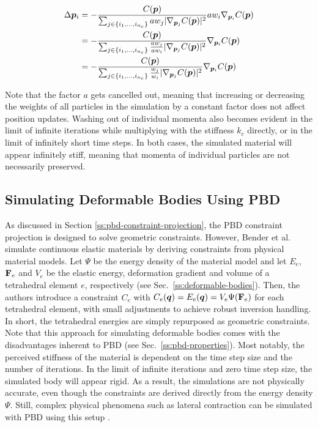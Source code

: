\begin{equation}\label{eq:pbd-masses}
    \begin{split}
        \Delta \bm{p}_i 
        &= -\frac{C(\bm{p})}{\sum_{j \in \{ i_1, \ldots, i_{n_c} \}} aw_j \vert \nabla_{\bm{p}_j}C(\bm{p}) \vert^2 } aw_i \nabla_{\bm{p}_i} C(\bm{p}) \\
        &= -\frac{C(\bm{p})}{\sum_{j \in \{ i_1, \ldots, i_{n_c} \}} \frac{aw_j}{aw_i} \vert \nabla_{\bm{p}_j}C(\bm{p}) \vert^2 } \nabla_{\bm{p}_i} C(\bm{p}) \\
        &= -\frac{C(\bm{p})}{\sum_{j \in \{ i_1, \ldots, i_{n_c} \}} \frac{w_j}{w_i} \vert \nabla_{\bm{p}_j}C(\bm{p}) \vert^2 } \nabla_{\bm{p}_i} C(\bm{p})
    \end{split}
\end{equation}

\noindent Note that the factor $a$ gets cancelled out, meaning that increasing or decreasing the weights of all particles in the simulation by a constant
factor does not affect position updates. Washing out of individual momenta also becomes evident in the limit of infinite iterations while multiplying 
with the stiffness $k_c$ directly, or in the limit of infinitely short time steps. In both cases, the simulated material will appear infinitely stiff, 
meaning that momenta of individual particles are not necessarily preserved.

\subsection{Simulating Deformable Bodies Using PBD}\label{ss:pbd-deformable-bodies}
As discussed in Section \ref{ss:pbd-constraint-projection}, the PBD constraint projection is designed to solve geometric constraints. However, Bender et al.\ 
\cite{bender2014} simulate continuous elastic materials by deriving constraints from physical material models. Let $\Psi$ be the energy density of the 
material model and let $E_e$, $\mathbf{F}_e$ and $V_e$ be the elastic energy, deformation gradient and volume of a tetrahedral element $e$, respectively
(see Sec.\ \ref{ss:deformable-bodies}). Then, the authors introduce a constraint $C_e$ with $C_e(\bm{q}) = E_e(\bm{q}) = V_e\Psi(\mathbf{F}_e)$ for each 
tetrahedral element, with small adjustments to achieve robust inversion handling. In short, the tetrahedral energies are simply repurposed as geometric 
constraints. Note that this approach for simulating 
deformable bodies comes with the disadvantages inherent to PBD (see Sec.\ \ref{ss:pbd-properties}). Most notably, the perceived stiffness of the material is 
dependent on the time step size and the number of iterations. In the limit of infinite iterations and zero time step size, the simulated body will 
appear rigid. As a result, the simulations are not physically accurate, even though the constraints are derived directly from the energy density $\Psi$. 
Still, complex physical phenomena such as lateral contraction can be simulated with PBD using this setup \cite{bender2014}.

